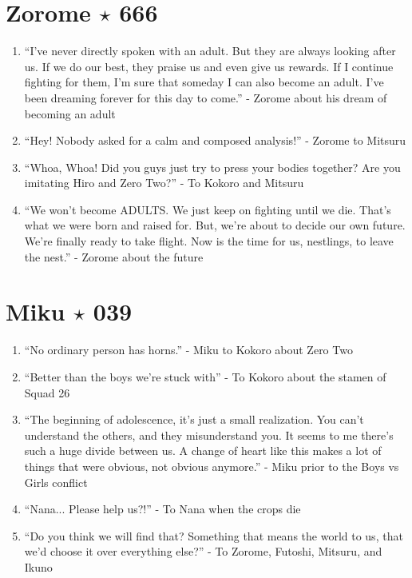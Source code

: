 \documentclass{book}
\numberwithin{equation}{section}
\begin{document}
\section{Zorome $\star$ 666}
\begin{enumerate}
    \item ``I've never directly spoken with an adult. But they are always looking after us. If we do our best, they praise us and even give us rewards. If I continue fighting for them, I'm sure that someday I can also become an adult. I've been dreaming forever for this day to come.'' - Zorome about his dream of becoming an adult
    \item ``Hey! Nobody asked for a calm and composed analysis!'' - Zorome to Mitsuru
    \item ``Whoa, Whoa! Did you guys just try to press your bodies together? Are you imitating Hiro and Zero Two?'' - To Kokoro and Mitsuru
    \item ``We won't become ADULTS. We just keep on fighting until we die. That's what we were born and raised for. But, we're about to decide our own future. We're finally ready to take flight. Now is the time for us, nestlings, to leave the nest.'' - Zorome about the future
\end{enumerate}

\section{Miku $\star$ 039}
\begin{enumerate}
    \item ``No ordinary person has horns.'' - Miku to Kokoro about Zero Two
    \item ``Better than the boys we're stuck with'' - To Kokoro about the stamen of Squad 26
    \item ``The beginning of adolescence, it's just a small realization. You can't understand the others, and they misunderstand you. It seems to me there's such a huge divide between us. A change of heart like this makes a lot of things that were obvious, not obvious anymore.'' - Miku prior to the Boys vs Girls conflict
    \item ``Nana... Please help us?!'' - To Nana when the crops die
    \item ``Do you think we will find that? Something that means the world to us, that we'd choose it over everything else?'' - To Zorome, Futoshi, Mitsuru, and Ikuno
\end{enumerate}
\end{document}

